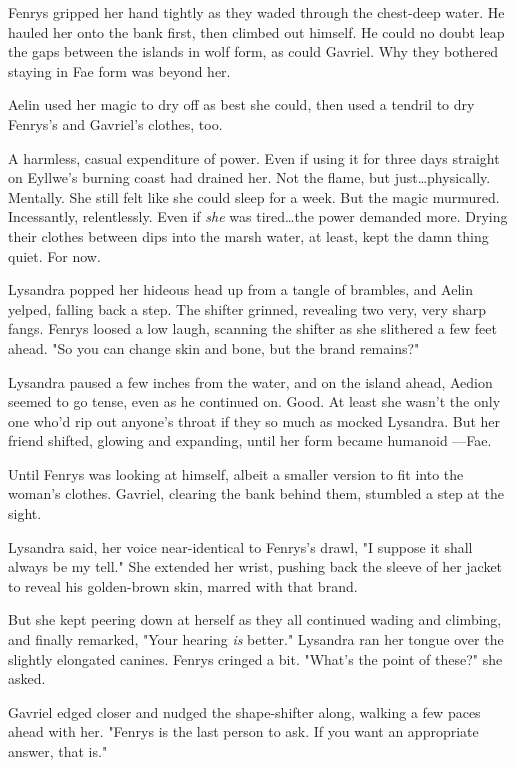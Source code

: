 Fenrys gripped her hand tightly as they waded through the chest-deep water.
He hauled her onto the bank first, then climbed out himself.
He could no doubt leap the gaps between the islands in wolf form, as could Gavriel.
Why they bothered staying in Fae form was beyond her.

Aelin used her magic to dry off as best she could, then used a tendril to dry Fenrys's and Gavriel's clothes, too.

A harmless, casual expenditure of power.
Even if using it for three days straight on Eyllwe's burning coast had drained her.
Not the flame, but just\ldots physically.
Mentally.
She still felt like she could sleep for a week.
But the magic murmured.
Incessantly, relentlessly.
Even if \emph{she} was tired\ldots the power demanded more.
Drying their clothes between dips into the marsh water, at least, kept the damn thing quiet.
For now.

Lysandra popped her hideous head up from a tangle of brambles, and Aelin yelped, falling back a step.
The shifter grinned, revealing two very, very sharp fangs.
Fenrys loosed a low laugh, scanning the shifter as she slithered a few feet ahead.
"So you can change skin and bone, but the brand remains?"

Lysandra paused a few inches from the water, and on the island ahead, Aedion seemed to go tense, even as he continued on.
Good.
At least she wasn't the only one who'd rip out anyone's throat if they so much as mocked Lysandra.
But her friend shifted, glowing and expanding, until her form became humanoid ---Fae.

Until Fenrys was looking at himself, albeit a smaller version to fit into the woman's clothes.
Gavriel, clearing the bank behind them, stumbled a step at the sight.

Lysandra said, her voice near-identical to Fenrys's drawl, "I suppose it shall always be my tell."
She extended her wrist, pushing back the sleeve of her jacket to reveal his golden-brown skin, marred with that brand.

But she kept peering down at herself as they all continued wading and climbing, and finally remarked, "Your hearing \emph{is} better."
Lysandra ran her tongue over the slightly elongated canines.
Fenrys cringed a bit.
"What's the point of these?"
she asked.

Gavriel edged closer and nudged the shape-shifter along, walking a few paces ahead with her.
"Fenrys is the last person to ask.
If you want an appropriate answer, that is."

